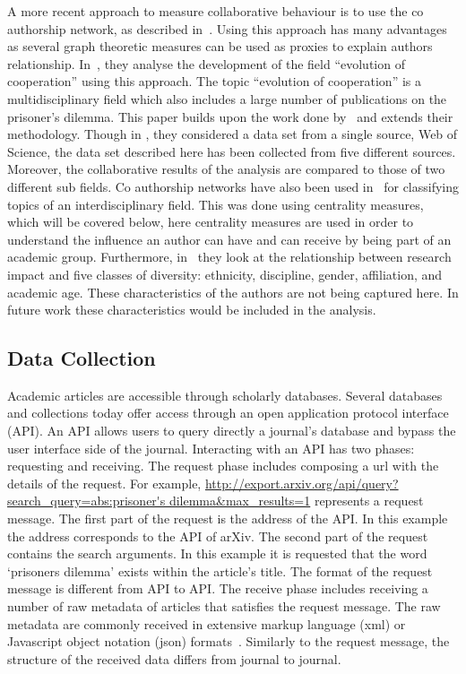 \documentclass{article}
\theoremstyle{definition}
\begin{document}
A more recent approach to measure collaborative behaviour is to use the co
authorship network, as described in~\cite{Liu2015}. Using this approach has many
advantages as several graph theoretic measures can be used as proxies to explain
authors relationship. In~\cite{Liu2015}, they analyse the development of the field
``evolution of cooperation'' using this approach. The topic ``evolution of cooperation''
is a multidisciplinary field which also includes a large number of publications
on the prisoner's dilemma. This paper builds upon the work done by~\cite{Liu2015}
and extends their methodology. Though in
\cite{Liu2015}, they considered a data set from a single source, Web of Science,
the data set described here has been collected from five different sources. Moreover, the collaborative
results of the analysis are compared to those of two different sub fields.
Co authorship networks have also been used in~\cite{youngblood2018} for classifying
topics of an interdisciplinary field. This was done using centrality measures,
which will be covered below, here centrality measures are used in order to understand
the influence an author can have and can receive by being part of an academic group.
Furthermore, in~\cite{alshebli2018} they look at the relationship between research
impact and five classes of diversity: ethnicity, discipline, gender, affiliation,
and academic age. These characteristics of the authors are not being captured here.
In future work these characteristics would be included in the analysis.

\subsection{Data Collection}\label{section:data_collection}

Academic articles are accessible through scholarly databases.
Several databases and collections today offer access through
an open application protocol interface (API). An API allows users to query
directly a journal's database and bypass the user interface side of the journal.
Interacting with an API has two phases: requesting and receiving.
The request phase includes composing a url with the details of the request. For
example, \url{http://export.arxiv.org/api/query?search_query=abs:prisoner's dilemma&max_results=1}
represents a request message. The first part of the request is the address
of the API.
In this example the address corresponds to the API of arXiv.
The second part of the request contains the search arguments. In this example 
it is requested that the word `prisoners dilemma' exists within the article's title.
The format of the request message is different from API to API.
The receive phase includes receiving a number of raw metadata of articles that
satisfies the request message. The raw metadata are commonly received in extensive markup
language (xml) or Javascript object notation (json) formats~\cite{nurseitov2009}.
Similarly to the request message, the structure of the received data differs from journal
to journal.
\end{document}

